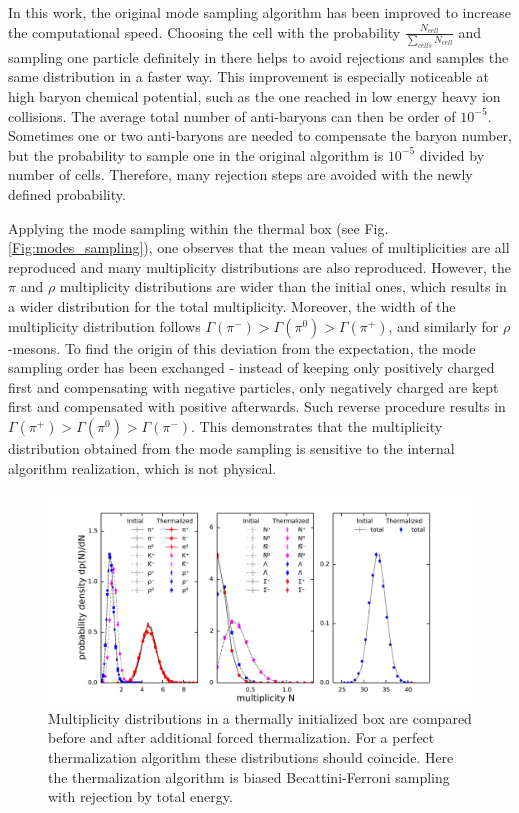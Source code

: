 In this work, the original mode sampling algorithm has been improved to
increase the computational speed. Choosing the cell with the  probability
$\frac{N_{cell}}{\sum_{cells} N_{cell}}$ and sampling one particle definitely
in there helps to avoid rejections and samples the same distribution in a
faster way. This improvement is especially noticeable at high baryon chemical
potential, such as the one reached in low energy heavy ion collisions. The
average total number of anti-baryons can then be order of $10^{-5}$. Sometimes
one or two anti-baryons are needed to compensate the baryon number, but the
probability to sample one in the original algorithm is $10^{-5}$ divided by
number of cells. Therefore, many rejection steps are avoided with the newly
defined probability.

Applying the mode sampling within the thermal box (see Fig.
\ref{Fig:modes_sampling}), one observes that the mean values of multiplicities
are all reproduced and many multiplicity distributions are also reproduced.
However, the $\pi$ and $\rho$ multiplicity distributions are wider than the
initial ones, which results in a wider distribution for the total multiplicity.
Moreover, the width of the multiplicity distribution follows $\Gamma(\pi^-) >
\Gamma(\pi^0) > \Gamma(\pi^+)$, and similarly for $\rho$-mesons. To find the
origin of this deviation from the expectation, the mode sampling order has been
exchanged - instead of keeping only positively charged first and compensating
with negative particles, only negatively charged are kept first and compensated
with positive afterwards. Such reverse procedure results in $\Gamma(\pi^+) >
\Gamma(\pi^0) > \Gamma(\pi^-)$. This demonstrates that the multiplicity distribution
obtained from the mode sampling is sensitive to the internal algorithm realization,
which is not physical.

\begin{figure}
  \includegraphics[width=\textwidth]{plots/forced_thermalization/BF_biased.pdf}
  \caption{Multiplicity distributions in a thermally initialized box are
           compared before and after additional forced thermalization. For a perfect
           thermalization algorithm these distributions should coincide. Here the
           thermalization algorithm is biased Becattini-Ferroni sampling with rejection by
           total energy.}
  \label{Fig:biasedBF_sampling}
\end{figure}

